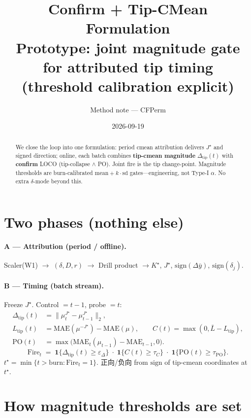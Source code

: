 \documentclass[11pt]{article}
\title{\textbf{Confirm + Tip-CMean Formulation}\\
\large Prototype: joint magnitude gate for attributed tip timing\\
\large (threshold calibration explicit)}
\author{Method note --- CFPerm}
\date{2026-09-19}
\newcommand{\Dtip}{\Delta_{\mathrm{tip}}}
\newcommand{\Jstar}{J^\star}
\newcommand{\Fire}{\mathrm{Fire}}
\begin{document}
\maketitle

\begin{abstract}
We close the loop into one formulation: period cmean attribution
delivers $\Jstar$ and signed direction; online, each batch combines
\textbf{tip-cmean magnitude} $\Dtip(t)$ with \textbf{confirm} LOCO
(tip-collapse $\wedge$ PO). Joint fire is the tip change-point.
Magnitude thresholds are burn-calibrated
$\mathrm{mean}+k\cdot\mathrm{sd}$ gates---engineering, not Type-I
$\alpha$. No extra $\delta$-mode beyond this.
\end{abstract}

\section{Two phases (nothing else)}
\paragraph{A --- Attribution (period / offline).}
Scaler(W1) $\to$ $(\delta,D,r)$ $\to$ Drill product $\to K^\star$,
$\Jstar$, $\mathrm{sign}(\Delta\bar y)$, $\mathrm{sign}(\delta_j)$.

\paragraph{B --- Timing (batch stream).}
Freeze $\Jstar$. Control $=t{-}1$, probe $=t$:
\begin{align}
  \Dtip(t)
  &= \bigl\|\mu_t^{\Jstar}-\mu_{t-1}^{\Jstar}\bigr\|_2,
  \label{eq:dtip}\\
  L_{\mathrm{tip}}(t)
  &= \mathrm{MAE}(\mu^{-\Jstar})-\mathrm{MAE}(\mu),
  \qquad
  C(t)=\max(0,\bar L-L_{\mathrm{tip}}),
  \label{eq:col}\\
  \mathrm{PO}(t)
  &= \max\bigl(\mathrm{MAE}_t(\mu_{t-1})-\mathrm{MAE}_{t-1},0\bigr).
\end{align}
\[
  \Fire_t
  \;=\;
  \mathbf{1}\{\Dtip(t)\ge\varepsilon_\Delta\}
  \;\cdot\;
  \mathbf{1}\{C(t)\ge\tau_C\}
  \;\cdot\;
  \mathbf{1}\{\mathrm{PO}(t)\ge\tau_{\mathrm{PO}}\}.
\]
$t^\star=\min\{t>\mathrm{burn}:\Fire_t=1\}$.
正向/负向 from $\mathrm{sign}$ of tip-cmean coordinates at $t^\star$.

\section{How magnitude thresholds are set}
\label{sec:thr}
\end{document}
